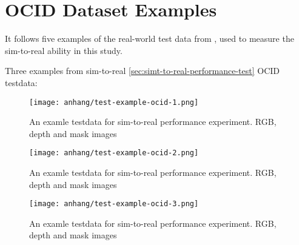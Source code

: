 \chapter{OCID Dataset Examples}
\label{appendix:testdata-ocid-examples-simtoreal}

	It follows five examples of the real-world test data from \cite{Suchi2019}, used to measure the sim-to-real ability in this study.
	
	Three examples from sim-to-real \ref{sec:simt-to-real-performance-test} OCID testdata:
	\begin{figure}[H]
		\centering
		\texttt{[image: anhang/test-example-ocid-1.png]}
		\caption[An examle testdata for sim-to-real performance experiment. RGB, depth and mask images]{An examle testdata for sim-to-real performance experiment. RGB, depth and mask images}
	\end{figure}
	\begin{figure}[H]
		\centering
		\texttt{[image: anhang/test-example-ocid-2.png]}
		\caption[An examle testdata for sim-to-real performance experiment. RGB, depth and mask images]{An examle testdata for sim-to-real performance experiment. RGB, depth and mask images}
	\end{figure}
	\begin{figure}[H]
		\centering
		\texttt{[image: anhang/test-example-ocid-3.png]}
		\caption[An examle testdata for sim-to-real performance experiment. RGB, depth and mask images]{An examle testdata for sim-to-real performance experiment. RGB, depth and mask images}
	\end{figure}
	
